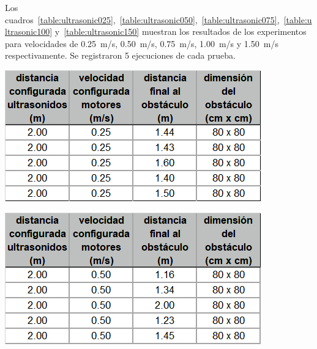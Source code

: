\documentclass[withindex,glossary]{cam-thesis}
\begin{document}
Los cuadros~\ref{table:ultrasonic025},~\ref{table:ultrasonic050},~\ref{table:ultrasonic075},~\ref{table:ultrasonic100} y~\ref{table:ultrasonic150} muestran los resultados de los experimentos para velocidades de \SI{0.25}{\metre/\second}, \SI{0.50}{\metre/\second}, \SI{0.75}{\metre/\second}, \SI{1.00}{\metre/\second} y \SI{1.50}{\metre/\second} respectivamente. Se registraron 5 ejecuciones de cada prueba.

\begin{table}
  \begin{minipage}[b]{0.4\textwidth}
    \caption[Test Distancia Ultrasonidos - Velocidad = \SI{0.25}{\metre/\second}]{Resultados de testeo de mecanismo de control de distancia con sensor de ultrasonidos, velocidad \SI{0.25}{\metre/\second}.}
    \includegraphics[width=\textwidth]{images/Test_Ultrasonic025}    
    \label{table:ultrasonic025}
  \end{minipage}
  \hfill
  \begin{minipage}[b]{0.4\textwidth}
  	\caption[Test Distancia Ultrasonidos - Velocidad = \SI{0.50}{\metre/\second}]{Resultados de testeo de mecanismo de control de distancia con sensor de ultrasonidos, velocidad \SI{0.50}{\metre/\second}.}
    \includegraphics[width=\textwidth]{images/Test_Ultrasonic050}    
    \label{table:ultrasonic050}
  \end{minipage}
\end{table}
\end{document}

